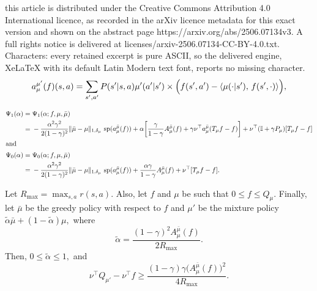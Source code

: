 \documentclass[10pt,a4paper]{amsart}
\newcommand{\ap}{a'}
\newcommand{\bI}{\mathbb{I}}
\newcommand{\mub}{\bar{\mu}}
\newcommand{\mup}{\mu'}
\newcommand{\stp}{s'}
\newcommand{\tr}{\top}
\renewcommand{\sp}{\mathrm{sp}}
\begin{document}
this article is distributed under the Creative Commons Attribution 4.0 International licence, as recorded in the arXiv licence metadata for this exact version and shown on the abstract page https://arxiv.org/abs/2506.07134v3. A full rights notice is delivered at licenses/arxiv-2506.07134-CC-BY-4.0.txt. Characters: every retained excerpt is pure ASCII, so the delivered engine, XeLaTeX with its default Latin Modern text font, reports no missing character.
\begin{equation}
    \label{e:a.mu.mup.s.a.defn}
    a_{\mu}^{\mup}(f)(s, a) = \sum_{s', \ap} P(\stp|s,a)  \mup(a'|s')
    \times \Bigl(
    f(s',a') - \langle \mu(\cdot|s'),\, f(s',\cdot)\rangle \Bigr),
\end{equation}

    \begin{align}
        \Psi_1(\alpha) = {} & \Psi_1(\alpha; f,  \mu, \mub) \nonumber \\
        = {} & - \frac{ \alpha^2 \gamma^2}{2  (1 - \gamma)^2} \|\mub - \mu\|_{1, \delta_\mu}\ \sp(a_\mu^{\mub} (f))  + \alpha\! \left[\frac{\gamma}{1 - \gamma} A_{\mu}^{\mub} (f) + \gamma \nu^\tr a_{\mu}^{\mub}(T_{\mu}f - f) \right] +  \nu^\tr(\bI + \gamma P_{\mu})[T_{\mu}f - f]  \label{e:perf.Diff.Quad.Bd.H.equals.1} \\
        \intertext{and}
        \Psi_0 (\alpha) = {} & \Psi_0(\alpha; f, \mu, \mub) \nonumber \\
        = {} & - \frac{ \alpha^2 \gamma^2}{2  (1 - \gamma)^2} \|\mub - \mu\|_{1, \delta_\mu}\ \sp(a_\mu^{\mub} (f))  + \frac{ \alpha\gamma}{1 - \gamma} A_{\mu}^{\mub} (f) + \nu^\tr [T_{\mu}f - f]. \label{e:perf.Diff.Quad.Bd}
    \end{align}

\begin{lemma}
\label{lem:A.mu.mub.Bd.al.less.than.1}
    Let $R_{\max} = \max_{s, a}r(s, a).$ Also, let $f$ and $\mu$ be such that  $0 \leq f \leq Q_{\mu}.$ Finally, let $\mub$ be the greedy policy with respect to $f$ and $\mup$ be the mixture policy $\tilde{\alpha} \mub + (1 - \tilde{\alpha}) \mu,$ where
    \[
        \tilde{\alpha} = \frac{(1 - \gamma)^2 A_{\mu}^{\mub}(f)}{2 R_{\max}}.
    \]
    Then, $0 \leq \tilde{\alpha} \leq 1,$ and 
    \[
        \nu^\tr Q_{\mup} - \nu^\tr f \geq \frac{(1 - \gamma) \gamma \Big(A_\mu^{\mub}(f)\Big)^2}{4 R_{\max}}.
    \]
\end{lemma}
\end{document}

